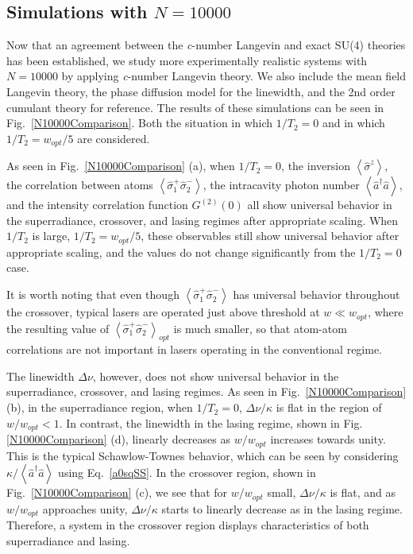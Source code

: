 \documentclass[aps,
twocolumn,
superscriptaddress,groupedaddress]{revtex4}
\begin{document}
\subsection{Simulations with $N=10000$}

Now that an agreement between the {\it c}-number Langevin and exact SU(4)
theories has been established, we study more experimentally realistic
systems with $N=10000$ by applying {\it c}-number Langevin theory. We also
include the mean field Langevin theory, the phase diffusion model for the linewidth, and the 2nd order cumulant theory for
reference. The results of these simulations can be seen in
Fig.~\ref{N10000Comparison}. Both the situation in which $1/T_2=0$ and
in which $1/T_2=w_{opt}/5$ are considered.

As seen in Fig.~\ref{N10000Comparison} (a), when $1/T_2=0$, the
inversion $\left<\hat{\sigma}^{z}\right>$, the correlation between atoms
$\left<\hat{\sigma}_{1}^{+} \hat{\sigma}_{2}^{-}\right>$, the
intracavity photon number  $\left<\hat{a}^{\dagger}\hat{a}\right>$,  and
the intensity correlation function $G^{(2)}(0)$ all show universal
behavior in the superradiance, crossover, and lasing regimes after
appropriate scaling. When $1/T_2$ is large, $1/T_2=w_{opt}/5$, these
observables still show universal behavior after appropriate scaling, and
the values do not change significantly from the $1/T_2=0$ case.

It is worth noting that even though  $\left<\hat{\sigma}_{1}^{+}
\hat{\sigma}_{2}^{-}\right>$ has universal behavior throughout the
crossover, typical lasers are operated just above threshold at $w \ll
w_{opt}$, where the resulting value of
$\left<\hat{\sigma}_{1}^{+}\hat{\sigma}_{2}^{-}\right>_{opt}$ is much
smaller, so that atom-atom correlations are not important in lasers operating in the conventional regime.

The linewidth $\Delta \nu$, however, does not show universal behavior in the superradiance, crossover, and lasing regimes. As seen in Fig.~\ref{N10000Comparison} (b), in the superradiance region, when $1/T_2=0$, $\Delta \nu / \kappa$ is flat in the region of $w/w_{opt}<1$. In contrast, the linewidth in the lasing regime, shown in Fig.\ref{N10000Comparison} (d), linearly decreases as $w/w_{opt}$ increases towards unity. This is the typical Schawlow-Townes behavior, which can be seen by considering $\kappa/\left<\hat{a}^{\dagger}\hat{a}\right>$ using Eq.~\ref{a0sqSS}. In the crossover region, shown in Fig.~\ref{N10000Comparison} (c), we see that for $w/w_{opt}$ small, $\Delta \nu/\kappa$ is flat, and as $w/w_{opt}$ approaches unity, $\Delta \nu/\kappa$ starts to linearly decrease as in the lasing regime. Therefore, a system in the crossover region displays characteristics of both superradiance and lasing. 
\end{document}
